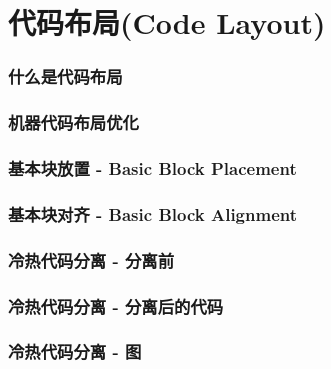 \section{代码布局(Code Layout)}

\begin{frame}[fragile]
    \frametitle{什么是代码布局}
    
\end{frame}

\begin{frame}
    \frametitle{机器代码布局优化}
    
\end{frame}


\begin{frame}[fragile]
    \frametitle{基本块放置 - Basic Block Placement}
    
\end{frame}

\begin{frame}
    \frametitle{基本块对齐 - Basic Block Alignment}
    
\end{frame}
\begin{frame}[fragile]
    \frametitle{冷热代码分离 - 分离前}
    
\end{frame}


\begin{frame}[fragile]
    \frametitle{冷热代码分离 - 分离后的代码}
    
\end{frame}

\begin{frame}
    \frametitle{冷热代码分离 - 图}
    
\end{frame}